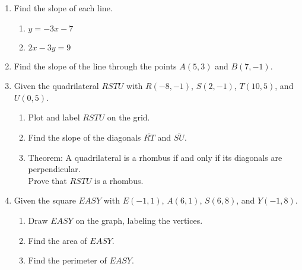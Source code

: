 \begin{enumerate}
\item Find the slope of each line.
\begin{multicols}{2}
  \begin{enumerate}
    \item $y=-3x-7$
    \item $2x-3y=9$
  \end{enumerate}
\end{multicols} \vspace{3cm}

\item Find the slope of the line through the points $A(5,3)$ and $B(7,-1)$. \vspace{3cm}

\newpage
\item Given the quadrilateral $RSTU$ with $R(-8,-1)$, $S(2,-1)$, $T(10,5)$, and $U(0,5)$.
  \begin{enumerate}
    \item Plot and label $RSTU$ on the grid.
    \item Find the slope of the diagonals $\overline{RT}$ and $\overline{SU}$.
    \item Theorem: A quadrilateral is a rhombus if and only if its diagonals are perpendicular.\\[0.5cm]
    Prove that $RSTU$ is a rhombus.
  \end{enumerate}
  \begin{center} %
  \end{center}

\newpage
\item Given the square $EASY$ with $E(-1, 1)$, $A(6, 1)$, $S(6, 8)$, and $Y(-1, 8)$.
  \begin{enumerate}
    \item Draw $EASY$ on the graph, labeling the vertices.
    \item Find the area of $EASY$. \vspace{2cm}
    \item Find the perimeter of $EASY$. \vspace{2cm}
  \end{enumerate}


\end{enumerate}
